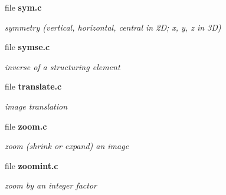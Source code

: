 \begin{DoxyCompactItemize}
\item 
file {\bf sym.c}


\begin{DoxyCompactList}\small\item\em symmetry (vertical, horizontal, central in 2D; x, y, z in 3D) \item\end{DoxyCompactList}

\item 
file {\bf symse.c}


\begin{DoxyCompactList}\small\item\em inverse of a structuring element \item\end{DoxyCompactList}

\item 
file {\bf translate.c}


\begin{DoxyCompactList}\small\item\em image translation \item\end{DoxyCompactList}

\item 
file {\bf zoom.c}


\begin{DoxyCompactList}\small\item\em zoom (shrink or expand) an image \item\end{DoxyCompactList}

\item 
file {\bf zoomint.c}


\begin{DoxyCompactList}\small\item\em zoom by an integer factor \item\end{DoxyCompactList}

\end{DoxyCompactItemize}
